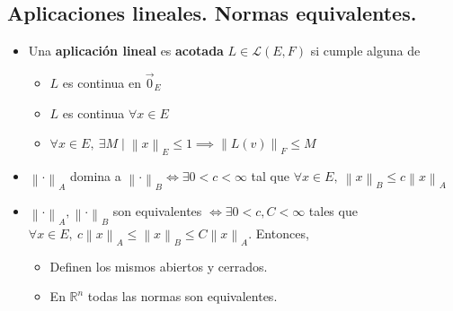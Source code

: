 \documentclass[a4paper,twocolumn]{extarticle}
\newcommand{\R}{\mathbb{R}}
\newcommand{\norma}[1]{\left\lVert#1\right\rVert}
\newcommand{\lacot}[1]{\mathcal{L}(#1)}
\begin{document}
\subsection{Aplicaciones lineales. Normas equivalentes.}
\begin{itemize}
	\item Una \textbf{aplicación lineal} es \textbf{acotada} $L \in \lacot{E, F}$ si cumple alguna de
	\begin{itemize}
		\item $L$ es continua en $\vec{0}_E$
		\item $L$ es continua $\forall x \in E$
		\item $\forall x \in E,\ \exists M \mid \norma{x}_E \leq 1 \implies \norma{L(v)}_F \leq M$
	\end{itemize}
	\item $\norma{\cdot}_A$ domina a $\norma{\cdot}_B \iff \exists 0 < c < \infty$ tal que $\forall x \in E,\ \norma{x}_B \leq c\norma{x}_A$
	\item $\norma{\cdot}_A, \norma{\cdot}_B$ son equivalentes $\iff \exists 0 < c, C < \infty$ tales que $\forall x \in E,\ c\norma{x}_A \leq \norma{x}_B \leq C\norma{x}_A$. Entonces,
	\begin{itemize}
		\item Definen los mismos abiertos y cerrados.
		\item En $\R^n$ todas las normas son equivalentes.
	\end{itemize}
	
\end{itemize}
\end{document}
